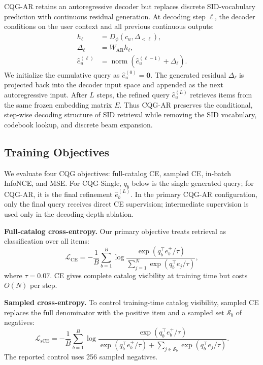 \documentclass[letterpaper]{article}
\begin{document}
CQG-AR retains an autoregressive decoder but replaces discrete SID-vocabulary prediction with continuous residual generation. At decoding step $\ell$, the decoder conditions on the user context and all previous continuous outputs:
\begin{align}
h_\ell &= D_\phi(c_u,\Delta_{<\ell}),\\
\Delta_\ell &= W_{\mathrm{AR}}h_\ell,\\
\hat e_u^{(\ell)} &=
\operatorname{norm}\!\left(\hat e_u^{(\ell-1)}+\Delta_\ell\right).
\end{align}
We initialize the cumulative query as
\(\hat e_u^{(0)}=\mathbf{0}\).
The generated residual $\Delta_\ell$ is projected back into the decoder input space and appended as the next autoregressive input. After $L$ steps, the refined query $\hat e_u^{(L)}$ retrieves items from the same frozen embedding matrix $E$. Thus CQG-AR preserves the conditional, step-wise decoding structure of SID retrieval while removing the SID vocabulary, codebook lookup, and discrete beam expansion.

\subsection{Training Objectives}

We evaluate four CQG objectives: full-catalog CE, sampled CE, in-batch
InfoNCE, and MSE. For CQG-Single, $q_b$ below is the single generated query;
for CQG-AR, it is the final refinement $\hat e_b^{(L)}$. In the primary
CQG-AR configuration, only the final query receives direct CE supervision;
intermediate supervision is used only in the decoding-depth ablation.

\textbf{Full-catalog cross-entropy.}
Our primary objective treats retrieval as classification over all items:
\begin{equation}
\mathcal{L}_{\mathrm{CE}}
= -\frac{1}{B}\sum_{b=1}^{B}
\log
\frac{\exp(q_b^\top e_b^+/\tau)}
{\sum_{j=1}^{N}\exp(q_b^\top e_j/\tau)} ,
\end{equation}
where $\tau=0.07$. CE gives complete catalog visibility at training time but costs $O(N)$ per step.

\textbf{Sampled cross-entropy.}
To control training-time catalog visibility, sampled CE replaces the full
denominator with the positive item and a sampled set
\(\mathcal S_b\) of negatives:
\begin{equation}
\mathcal{L}_{\mathrm{sCE}}
=-\frac{1}{B}\sum_{b=1}^{B}\log
\frac{\exp(q_b^\top e_b^+/\tau)}
{\exp(q_b^\top e_b^+/\tau)+
\sum_{j\in\mathcal S_b}\exp(q_b^\top e_j/\tau)} .
\end{equation}
The reported control uses 256 sampled negatives.
\end{document}
